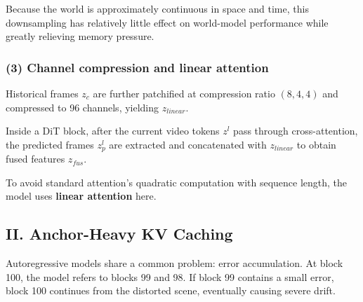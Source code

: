 Because the world is approximately continuous in space and time, this downsampling has relatively little effect on world-model performance while greatly relieving memory pressure.

\hypertarget{channel-compression-and-linear-attention}{%
\subsubsection{(3) Channel compression and linear attention}\label{channel-compression-and-linear-attention}}

Historical frames \(z_c\) are further patchified at compression ratio \((8,4,4)\) and compressed to 96 channels, yielding \(z_{linear}\).

Inside a DiT block, after the current video tokens \(z^l\) pass through cross-attention, the predicted frames \(z_p^l\) are extracted and concatenated with \(z_{linear}\) to obtain fused features \(z_{fus}\).

To avoid standard attention's quadratic computation with sequence length, the model uses \textbf{linear attention} here.

\hypertarget{ii.-anchor-heavy-kv-caching}{%
\subsection{II. Anchor-Heavy KV Caching}\label{ii.-anchor-heavy-kv-caching}}

Autoregressive models share a common problem: error accumulation. At block 100, the model refers to blocks 99 and 98. If block 99 contains a small error, block 100 continues from the distorted scene, eventually causing severe drift.

